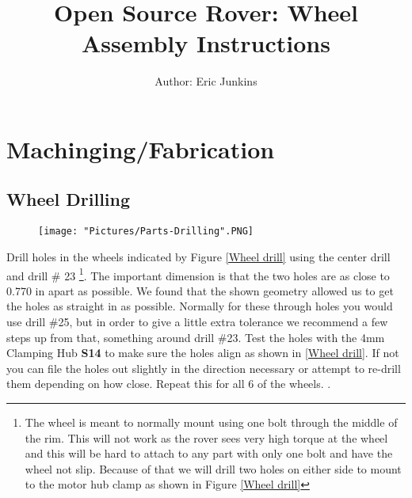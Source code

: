 \documentclass[12pt]{article}
\begin{document}
\title{Open Source Rover: Wheel Assembly Instructions}
\author{Author: Eric Junkins}

\makeatletter         
\def\@maketitle{
\begin{center}	
	\makebox[\textwidth][c]{ \texttt{[image: "Pictures/Wheels/Wheels Title".png]}}
	{\Huge \bfseries \sffamily \@title }\\[3ex] 
	{\Large \sffamily \@author}\\[3ex] 
	\texttt{[image: "Pictures/Misc/JPL logo".png]}
\end{center}}
\makeatother

\maketitle




\newpage


\tableofcontents

\newpage

\section{Machinging/Fabrication}

\subsection{Wheel Drilling}

\begin{figure}[H]
	\centering
	\texttt{[image: "Pictures/Parts-Drilling".PNG]}
\end{figure}

Drill holes in the wheels indicated by Figure \ref{Wheel drill} using the center drill and drill \# 23 \footnote{The wheel is meant to normally mount using one bolt through the middle of the rim. This will not work as the rover sees very high torque at the wheel and this will be hard to attach to any part with only one bolt and have the wheel not slip. Because of that we will drill two holes on either side to mount to the motor hub clamp as shown in Figure \ref{Wheel drill}}. The important dimension is that the two holes are as close to 0.770 in apart as possible. We found that the shown geometry allowed us to get the holes as straight in as possible. Normally for these through holes you would use drill \#25, but in order to give a little extra tolerance we recommend a few steps up from that, something around drill \#23. Test the holes with the 4mm Clamping Hub \textbf{S14} to make sure the holes align as shown in \ref{Wheel drill}. If not you can file the holes out slightly in the direction necessary or attempt to re-drill them depending on how close. Repeat this for all 6 of the wheels.
. 
\end{document}
